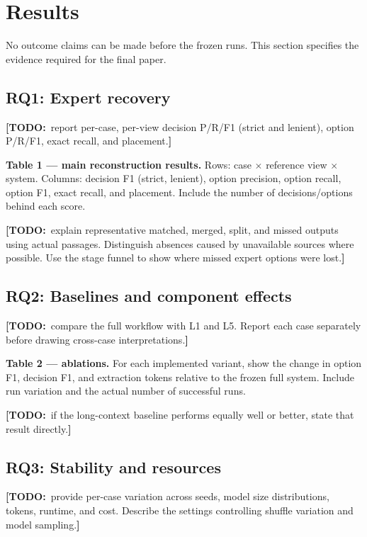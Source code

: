 \documentclass[conference]{IEEEtran}
\newcommand{\todo}[1]{{\color{red}\textbf{[TODO:}~#1\textbf{]}}}
\begin{document}
\section{Results}

No outcome claims can be made before the frozen runs. This section specifies the evidence required for the final paper.

\subsection{RQ1: Expert recovery}

\todo{report per-case, per-view decision P/R/F1 (strict and lenient), option P/R/F1, exact recall, and placement.}

\textbf{Table 1 --- main reconstruction results.} Rows: case $\times$ reference view $\times$ system. Columns: decision F1 (strict, lenient), option precision, option recall, option F1, exact recall, and placement. Include the number of decisions/options behind each score.

\todo{explain representative matched, merged, split, and missed outputs using actual passages. Distinguish absences caused by unavailable sources where possible. Use the stage funnel to show where missed expert options were lost.}

\subsection{RQ2: Baselines and component effects}

\todo{compare the full workflow with L1 and L5. Report each case separately before drawing cross-case interpretations.}

\textbf{Table 2 --- ablations.} For each implemented variant, show the change in option F1, decision F1, and extraction tokens relative to the frozen full system. Include run variation and the actual number of successful runs.

\todo{if the long-context baseline performs equally well or better, state that result directly.}

\subsection{RQ3: Stability and resources}

\todo{provide per-case variation across seeds, model size distributions, tokens, runtime, and cost. Describe the settings controlling shuffle variation and model sampling.}
\end{document}
